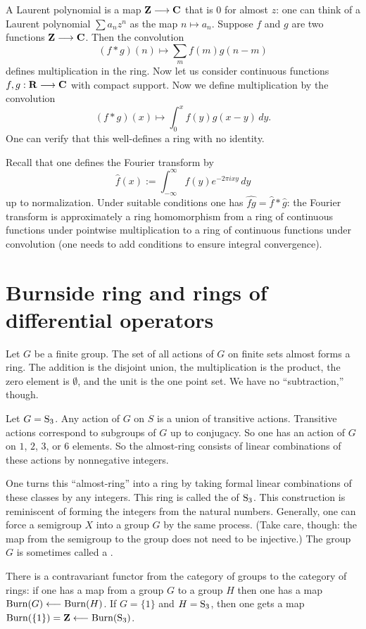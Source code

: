 \documentclass[11pt, oneside,margin=1in]{article}
\begin{document}
A Laurent polynomial is a map $\mathbf Z\longrightarrow \mathbf C$ that is $0$ for almost $z$: one can think of a Laurent polynomial $\sum a_nz^n$ as the map $n\longmapsto a_n$. Suppose $f$ and $g$ are two functions $\mathbf Z\longrightarrow\mathbf C$. Then the convolution
$$
(f*g)(n) \longmapsto \sum_m f(m)g(n-m)
$$
defines multiplication in the ring. Now let us consider continuous functions $f, g : \mathbf R\longrightarrow \mathbf C$ with compact support. Now we define multiplication by the convolution
$$
(f*g)(x) \longmapsto \int_0^x f(y) g(x-y) \,d y.
$$
One can verify that this well-defines a ring with no identity.

Recall that one defines the Fourier transform by
$$
\widehat f(x) := \int_{-\infty}^\infty f(y) e^{-2\pi i x y} \,d y
$$
up to normalization. Under suitable conditions one has $\widehat {fg} = \widehat f *\widehat g$: the Fourier transform is approximately a ring homomorphism from a ring of continuous functions under pointwise multiplication to a ring of continuous functions under convolution (one needs to add conditions to ensure integral convergence).

\section{Burnside ring and rings of differential operators}
Let $G$ be a finite group. The set of all actions of $G$ on finite sets almost forms a ring. The addition is the disjoint union, the multiplication is the product, the zero element is $\emptyset$, and the unit is the one point set. We have no ``subtraction,'' though.

Let $G=\operatorname{S}_3$. Any action of $G$ on $S$ is a union of transitive actions. Transitive actions correspond to subgroups of $G$ up to conjugacy. So one has an action of $G$ on $1$, $2$, $3$, or $6$ elements. So the almost-ring consists of linear combinations of these actions by nonnegative integers. 

One turns this ``almost-ring'' into a ring by taking formal linear combinations of these classes by any integers. This ring is called the  of $\operatorname{S}_3$. This construction is reminiscent of forming the integers from the natural numbers. Generally, one can force a semigroup $X$ into a group $G$ by the same process. (Take care, though: the map from the semigroup to the group does not need to be injective.) The group $G$ is sometimes called a .


There is a contravariant functor from the category of groups to the category of rings: if one has a map from a group $G$ to a group $H$ then one has a map $\operatorname{Burn} (G) \longleftarrow \operatorname{Burn}(H)$. If $G=\{1\}$ and $H=\operatorname{S}_3$, then one gets a map $\operatorname{Burn}(\{1\}) =\mathbf Z \longleftarrow \operatorname{Burn}(\operatorname{S}_3)$.
\end{document}
